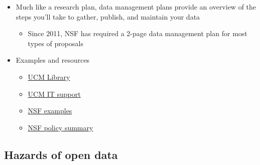 \documentclass[
]{article}
\providecommand{\tightlist}{%
  \setlength{\itemsep}{0pt}\setlength{\parskip}{0pt}}
\begin{document}
\begin{itemize}
\tightlist
\item
  Much like a research plan, data management plans provide an overview of the steps you'll take to gather, publish, and maintain your data

  \begin{itemize}
  \tightlist
  \item
    Since 2011, NSF has required a 2-page data management plan for most types of proposals
  \end{itemize}
\item
  Examples and resources

  \begin{itemize}
  \tightlist
  \item
    \href{https://library.ucmerced.edu/research/researchers/research-data-management/data-management-plans}{UCM Library}
  \item
    \href{https://it.ucmerced.edu/content/research-data-management-consultation-service}{UCM IT support}
  \item
    \href{https://libraries.ucsd.edu/research-and-collections/data-curation/dmp-samples.html}{NSF examples}
  \item
    \href{https://www.nsf.gov/bfa/dias/policy/dmp.jsp}{NSF policy summary}
  \end{itemize}
\end{itemize}

\hypertarget{hazards-of-open-data}{%
\subsection{Hazards of open data}\label{hazards-of-open-data}}
\end{document}
